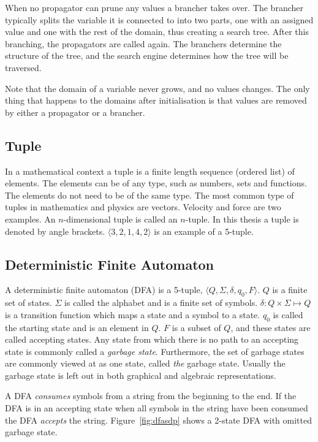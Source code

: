 \documentclass[a4paper,11pt]{article}
\begin{document}
When no propagator can prune any values a brancher takes over. The brancher typically splits the variable it is connected to into two parts, one with an assigned value and one with the rest of the domain, thus creating a search tree. After this branching, the propagators are called again. The branchers determine the structure of the tree, and the search engine determines how the tree will be traversed. 

Note that the domain of a variable never grows, and no values changes. The only thing that happens to the domains after initialisation is that values are removed by either a propagator or a brancher.

\subsection{Tuple}
In a mathematical context a tuple is a finite length sequence (ordered list) of elements. The elements can be of any type, such as numbers, sets and functions. The elements do not need to be of the same type. The most common type of tuples in mathematics and physics are vectors. Velocity and force are two examples. An $n$-dimensional tuple is called an $n$-tuple. In this thesis a tuple is denoted by angle brackets. $\langle 3, 2, 1, 4, 2 \rangle$ is an example of a 5-tuple.

\subsection{Deterministic Finite Automaton}
A deterministic finite automaton (DFA) is a 5-tuple, $\langle Q,\Sigma,\delta,q_0, F\rangle$. $Q$ is a finite set of states. $\Sigma$ is called the alphabet and is a finite set of symbols. $\delta : Q \times \Sigma \mapsto Q$  is a transition function which maps a state and a symbol to a state. $q_0$ is called the starting state and is an element in $Q$. $F$ is a subset of $Q$, and these states are called accepting states. Any state from which there is no path to an accepting state is commonly called a \textit{garbage state}. Furthermore, the set of garbage states are commonly viewed at as one state, called \textit{the} garbage state. Usually the garbage state is left out in both graphical and algebraic representations. 

A DFA \textit{consumes} symbols from a string from the beginning to the end. If the DFA is in an accepting state when all symbols in the string have been consumed the DFA \textit{accepts} the string. Figure~\ref{fig:dfasdp} shows a 2-state DFA with omitted garbage state.
\end{document}
